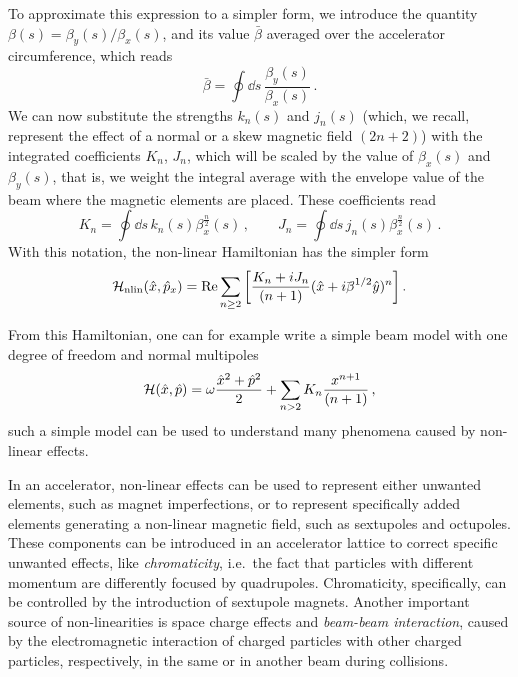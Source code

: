 To approximate this expression to a simpler form, we introduce the quantity $\beta(s)=\beta_y(s)/\beta_x(s)$, and its value $\bar\beta$ averaged over the accelerator circumference, which reads
\begin{equation}
    \bar\beta = \oint \dd s\, \frac{\beta_y(s)}{\beta_x(s)} \,.
\end{equation}
We can now substitute the strengths $k_n(s)$ and $j_n(s)$ (which, we recall, represent the effect of a normal or a skew magnetic field $(2n+2)$) with the integrated coefficients $K_n$, $J_n$, which will be scaled by the value of $\beta_x(s)$ and $\beta_y(s)$, that is, we weight the integral average with the envelope value of the beam where the magnetic elements are placed. These coefficients read
%
\begin{equation} 
	K_n = \oint \dd s\, k_n(s) \beta_x^{\frac{n}{2}}(s)\,,\qquad
	J_n = \oint \dd s\, j_n(s) \beta_x^{\frac{n}{2}}(s)\,.
\end{equation} 
%
With this notation, the non-linear Hamiltonian has the simpler form
% 
\begin{equation} \ham_\text{nlin}(\hat x, \hat p_x) = \Re \sum_{n\ge 2} \qty[\frac{K_n + iJ_n}{(n+1)} (\hat x + i\bar\beta^{1/2} \hat y)^n]\,.\end{equation}

From this Hamiltonian, one can for example write a simple beam model with one degree of freedom and normal multipoles
\begin{equation}
	\mathcal{H}(\hat x,\hat p) = \omega \frac{\hat x^2 + \hat p^2}{2} + \sum_{n>2} K_n \frac{x^{n+1}}{(n+1)}\, ,
	\label{eq:hamxp_nl}
\end{equation}
such a simple model can be used to understand many phenomena caused by non-linear effects.

In an accelerator, non-linear effects can be used to represent either unwanted elements, such as magnet imperfections, or to represent specifically added elements generating a non-linear magnetic field, such as sextupoles and octupoles. These components can be introduced in an accelerator lattice to correct specific unwanted effects, like \textit{chromaticity}, i.e.\ the fact that particles with different momentum are differently focused by quadrupoles. Chromaticity, specifically, can be controlled by the introduction of sextupole magnets. Another important source of non-linearities is space charge effects and \textit{beam-beam interaction}, caused by the electromagnetic interaction of charged particles with other charged particles, respectively, in the same or in another beam during collisions.

